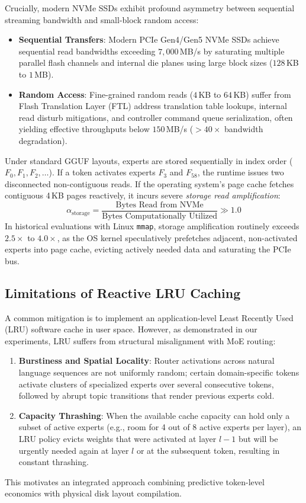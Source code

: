 Crucially, modern NVMe SSDs exhibit profound asymmetry between sequential streaming bandwidth and small-block random access:
\begin{itemize}
    \item \textbf{Sequential Transfers}: Modern PCIe Gen4/Gen5 NVMe SSDs achieve sequential read bandwidths exceeding $7{,}000$\,MB/s by saturating multiple parallel flash channels and internal die planes using large block sizes ($128$\,KB to $1$\,MB).
    \item \textbf{Random Access}: Fine-grained random reads ($4$\,KB to $64$\,KB) suffer from Flash Translation Layer (FTL) address translation table lookups, internal read disturb mitigations, and controller command queue serialization, often yielding effective throughputs below $150$\,MB/s ($>40\times$ bandwidth degradation).
\end{itemize}

Under standard GGUF layouts, experts are stored sequentially in index order ($F_0, F_1, F_2, \dots$). If a token activates experts $F_3$ and $F_{58}$, the runtime issues two disconnected non-contiguous reads. If the operating system's page cache fetches contiguous 4\,KB pages reactively, it incurs severe \emph{storage read amplification}:
\begin{equation}
    \alpha_{\text{storage}} = \frac{\text{Bytes Read from NVMe}}{\text{Bytes Computationally Utilized}} \gg 1.0
\end{equation}
In historical evaluations with Linux \texttt{mmap}, storage amplification routinely exceeds $2.5\times$ to $4.0\times$, as the OS kernel speculatively prefetches adjacent, non-activated experts into page cache, evicting actively needed data and saturating the PCIe bus.

\subsection{Limitations of Reactive LRU Caching}
A common mitigation is to implement an application-level Least Recently Used (LRU) software cache in user space. However, as demonstrated in our experiments, LRU suffers from structural misalignment with MoE routing:
\begin{enumerate}
    \item \textbf{Burstiness and Spatial Locality}: Router activations across natural language sequences are not uniformly random; certain domain-specific tokens activate clusters of specialized experts over several consecutive tokens, followed by abrupt topic transitions that render previous experts cold.
    \item \textbf{Capacity Thrashing}: When the available cache capacity can hold only a subset of active experts (e.g., room for 4 out of 8 active experts per layer), an LRU policy evicts weights that were activated at layer $l-1$ but will be urgently needed again at layer $l$ or at the subsequent token, resulting in constant thrashing.
\end{enumerate}
This motivates an integrated approach combining predictive token-level economics with physical disk layout compilation.
